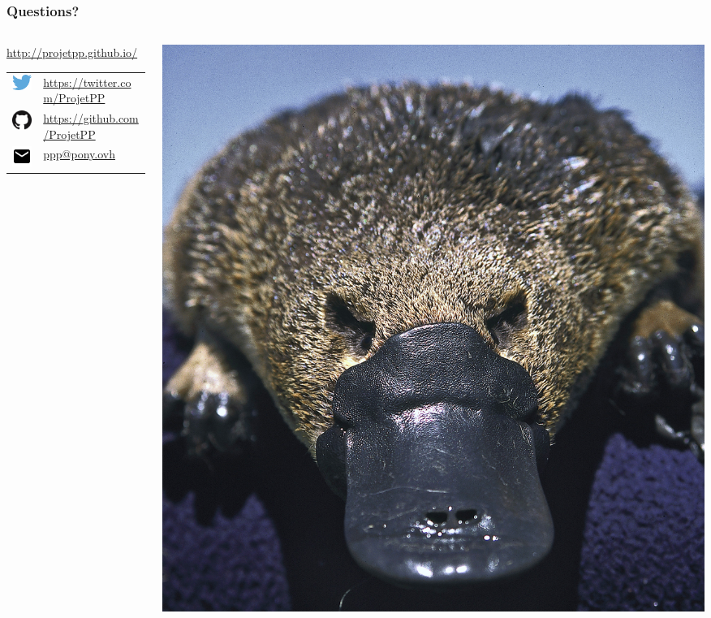 \newlength{\logosize}
\setlength{\logosize}{12pt}
\begin{frame}
    \frametitle{Questions?}
    
    \begin{columns}
    \begin{column}{0.6\textwidth}
        \alert{\url{http://projetpp.github.io/}}
        \begin{tabular}{ll}
            \includegraphics[width=\logosize]{Twitter_logo_blue.png} & \href{https://twitter.com/ProjetPP}{https://twitter.com/ProjetPP}\\
            \includegraphics[width=\logosize]{GitHub-Mark-32px.png} &  \href{https://github.com/ProjetPP}{https://github.com/ProjetPP}\\
            \includegraphics[width=\logosize]{ic_email_black_18dp.png} & \href{mailto:ppp@pony.ovh}{ppp@pony.ovh}\\
        \end{tabular}
    \end{column}
    \begin{column}{0.4\textwidth}
        \includegraphics[width=\linewidth]{figures/Ornithorhynchus.jpg}
    \end{column}
    \end{columns}
\end{frame}

